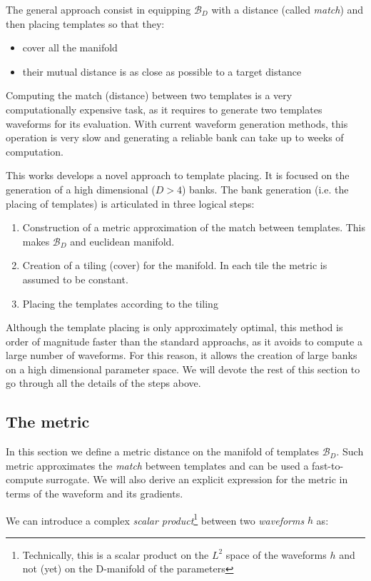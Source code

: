 \documentclass[twocolumn,showpacs,preprintnumbers,nofootinbib,prd,
superscriptaddress,10pt]{revtex4-1}
\begin{document}
The general approach consist in equipping $\mathcal{B}_D$ with a distance (called {\it match}) and then placing templates so that they:
\begin{itemize}
	\item cover all the manifold
	\item their mutual distance is as close as possible to a target distance
\end{itemize}
Computing the match (distance) between two templates is a very computationally expensive task, as it requires to generate two templates waveforms for its evaluation. With current waveform generation methods, this operation is very slow and generating a reliable bank can take up to weeks of computation.

This works develops a novel approach to template placing. It is focused on the generation of a high dimensional ($D>4$) banks.
The bank generation (i.e. the placing of templates) is articulated in three logical steps:

\begin{enumerate}
	\item Construction of a metric approximation of the match between templates. This makes $\mathcal{B}_D$ and euclidean manifold.
	\item Creation of a tiling (cover) for the manifold. In each tile the metric is assumed to be constant.
	\item Placing the templates according to the tiling
\end{enumerate}

Although the template placing is only approximately optimal, this method is order of magnitude faster than the standard approachs, as it avoids to compute a large number of waveforms. For this reason, it allows the creation of large banks on a high dimensional parameter space.
We will devote the rest of this section to go through all the details of the steps above.

\subsection{The metric} \label{sec:metric}

In this section we define a metric distance on the manifold of templates $\mathcal{B}_D$. Such metric approximates the {\it match} between templates and can be used a fast-to-compute surrogate. We will also derive an explicit expression for the metric in terms of the waveform and its gradients.

We can introduce a complex \textit{scalar product}\footnote{
Technically, this is a scalar product on the $L^2$ space of the waveforms $h$ and not (yet) on the D-manifold of the parameters
} between two \textit{waveforms} $h$ as:
\end{document}
